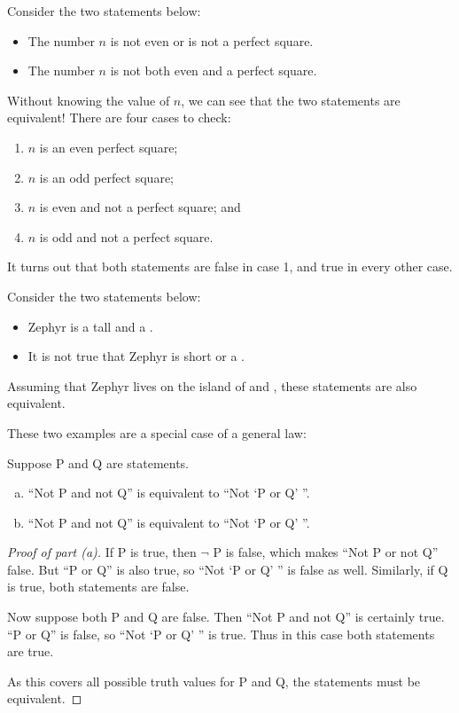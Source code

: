 \documentclass{tufte-book}
\begin{document}
\begin{example}
  Consider the two statements below:
  \begin{itemize}
      \item The number $n$ is not even or is not a perfect square.
      \item The number $n$ is not both even and a perfect square.
  \end{itemize}
  Without knowing the value of $n$, we can see that the two statements are equivalent! There are four cases to check:
  \begin{enumerate}
      \item $n$ is an even perfect square;
      \item $n$ is an odd perfect square;
      \item $n$ is even and not a perfect square; and
      \item $n$ is odd and not a perfect square.
  \end{enumerate}
  It turns out that both statements are false in case 1, and true in every other case.
\end{example}

\begin{example}
  Consider the two statements below:
  \begin{itemize}
      \item Zephyr is a tall and a \knave.
      \item It is not true that Zephyr is short or a \knight.
  \end{itemize}
  Assuming that Zephyr lives on the island of \knights and \knaves, these statements are also equivalent.
\end{example}

These two examples are a special case of a general law:
\begin{theorem}
  Suppose P and Q are statements.
  \begin{enumerate}[(a)]
      \item ``Not P and not Q'' is equivalent to ``Not `P or Q' ''.
      \item ``Not P and not Q'' is equivalent to ``Not `P or Q' ''.
  \end{enumerate}
\end{theorem}

\begin{proof}[Proof of part (a)]
  If P is true, then $\neg$ P is false, which makes ``Not P or not Q'' false. But ``P or Q'' is also true, so ``Not `P or Q' '' is false as well. Similarly, if Q is true, both statements are false.

  Now suppose both P and Q are false. Then ``Not P and not Q'' is certainly true. ``P or Q'' is false, so ``Not `P or Q' '' is true. Thus in this case both statements are true.

  As this covers all possible truth values for P and Q, the statements must be equivalent.
\end{proof}
\end{document}
